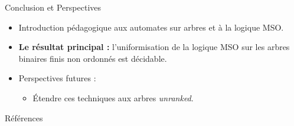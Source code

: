 \documentclass[10pt,xcolor=dvipsnames]{beamer}
\theoremstyle{plain}
\begin{document}
\begin{frame}{Conclusion et Perspectives}
	\begin{itemize}
		\item Introduction pédagogique aux automates sur arbres et à la logique MSO.
		      \vspace{0.7em}
		\item \textbf{Le résultat principal :} l’uniformisation de la logique MSO sur les arbres binaires finis non ordonnés est décidable.
		      \vspace{0.7em}
		\item Perspectives futures :
		      \begin{itemize}
			      \item Étendre ces techniques aux arbres \textit{unranked}.
		      \end{itemize}
	\end{itemize}
\end{frame}


\begin{frame}[shrink=15]{Références}
	\nocite{*}
	
	
\end{frame}
\end{document}
